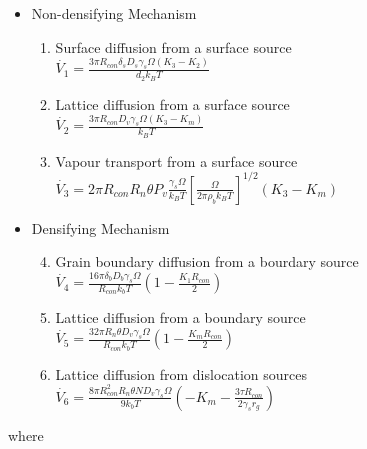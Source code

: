 \documentclass[11pt]{article} %
\begin{document}
	\begin{itemize}
	\item Non-densifying Mechanism
		\begin{enumerate}
		\item Surface diffusion from a surface source \\
	$\dot{V_{1}} = \frac{3 \pi R_{con} \delta_{s} D_{s}\gamma_{s} \Omega (K_{3}-K_{2})}{d_{2}k_{B}T}$
		\item Lattice diffusion from a surface source \\
	$\dot{V_{2}} = \frac{3 \pi R_{con} D_{v}\gamma_{s} \Omega (K_{3}-K_{m})}{k_{B}T}$
		\item Vapour transport from a surface source \\
	$\dot{V_{3}} = 2 \pi R_{con} R_{n} \theta P_{v} \frac{\gamma_{s} \Omega}{k_{B}T}\left[ \frac{\Omega}{2 \pi \rho_{b} k_{B}T} \right]^{1/2} (K_{3}-K_{m})$
		\end{enumerate}
	\item Densifying Mechanism
		\begin{enumerate}
		\setcounter{enumi}{3}
		\item Grain boundary diffusion from a bourdary source \\
	$\dot{V_{4}} = \frac{16\pi \delta_{b} D_{b}\gamma_{s}\Omega}{R_{con}k_{b}T}\left(1-\frac{K_{1}R_{con}}{2}\right)$
		\item Lattice diffusion from a boundary source \\
	$\dot{V_{5}} = \frac{32\pi R_{n} \theta D_{v}\gamma_{s}\Omega}{R_{con}k_{b}T}\left(1-\frac{K_{m}R_{con}}{2}\right)$
		\item Lattice diffusion from dislocation sources \\
	$\dot{V_{6}} = \frac{8\pi R_{con}^{2} R_{n} \theta N D_{v}\gamma_{s}\Omega}{9 k_{b}T}\left(-K_{m}-\frac{3 \tau R_{con}}{2 \gamma_{s} r_{g}}\right)$
		\end{enumerate}
	\end{itemize}
	
	where
	
\end{document}
